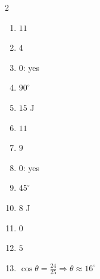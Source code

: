 \documentclass[11pt]{article}
\begin{document}
\begin{keybox}
\begin{multicols}{2}
\small
\begin{enumerate}[leftmargin=*,itemsep=3pt]
  \item $11$
  \item $4$
  \item $0$: yes
  \item $90^\circ$
  \item $15$ J
  \item $11$
  \item $9$
  \item $0$: yes
  \item $45^\circ$
  \item $8$ J
  \item $0$
  \item $5$
  \item $\cos\theta=\tfrac{24}{25}\Rightarrow\theta\approx16^\circ$
\end{enumerate}
\end{multicols}
\end{keybox}
\end{document}
